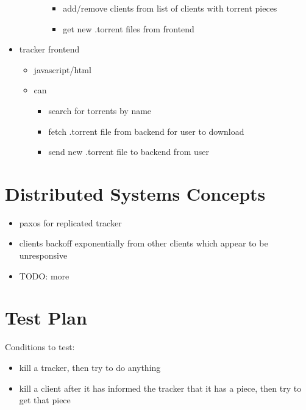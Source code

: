\documentclass[11pt]{article}
\begin{document}
\begin{itemize}
\begin{itemize}
\begin{itemize}
\begin{itemize}
                                    \item add/remove clients from list of clients with torrent pieces
                                    \item get new .torrent files from frontend
                                \end{itemize}
                        \end{itemize}
                \end{itemize}
            \item tracker frontend
                \begin{itemize}
                    \item javascript/html
                    \item can
                        \begin{itemize}
                            \item search for torrents by name
                            \item fetch .torrent file from backend for user to download
                            \item send new .torrent file to backend from user
                        \end{itemize}
                \end{itemize}
        \end{itemize}


    \section*{Distributed Systems Concepts}

        \begin{itemize}
            \item paxos for replicated tracker
            \item clients backoff exponentially from other clients which appear to be unresponsive
            \item TODO: more
        \end{itemize}

    \section*{Test Plan}

        Conditions to test:
        \begin{itemize}
            \item kill a tracker, then try to do anything
            \item kill a client after it has informed the tracker that it has a piece, then try to get that piece
        \end{itemize}
\end{document}
